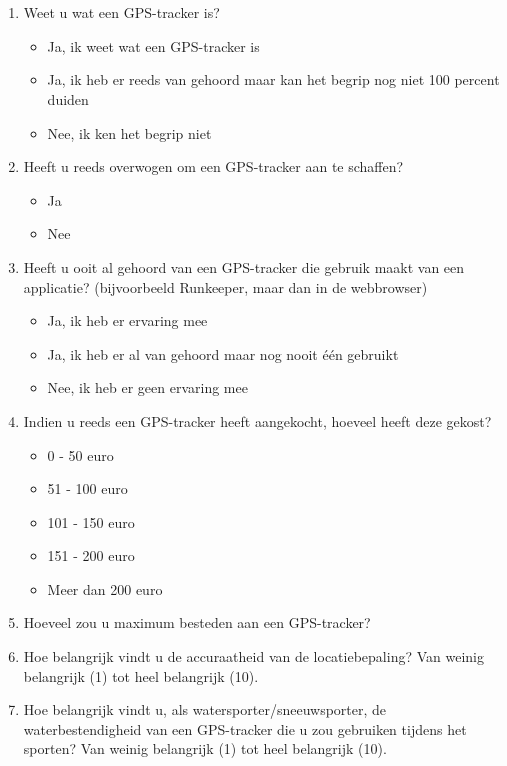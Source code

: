 \chapter{}
\label{ch:enquete}
\begin{enumerate}
	\item Weet u wat een GPS-tracker is?
	\begin{itemize}
		\item Ja, ik weet wat een GPS-tracker is
		\item Ja, ik heb er reeds van gehoord maar kan het begrip nog niet 100 percent duiden
		\item Nee, ik ken het begrip niet
	\end{itemize}
	\item Heeft u reeds overwogen om een GPS-tracker aan te schaffen?
	\begin{itemize}
		\item Ja
		\item Nee
	\end{itemize}
	\item Heeft u ooit al gehoord van een GPS-tracker die gebruik maakt van een applicatie? (bijvoorbeeld Runkeeper, maar dan in de webbrowser)
	\begin{itemize}
		\item Ja, ik heb er ervaring mee
		\item Ja, ik heb er al van gehoord maar nog nooit één gebruikt
		\item Nee, ik heb er geen ervaring mee
	\end{itemize}
	\item Indien u reeds een GPS-tracker heeft aangekocht, hoeveel heeft deze gekost?
	\begin{itemize}
		\item 0 - 50 euro
		\item 51 - 100 euro
		\item 101 - 150 euro
		\item 151 - 200 euro
		\item Meer dan 200 euro
	\end{itemize}
	\item Hoeveel zou u maximum besteden aan een GPS-tracker?
	\item Hoe belangrijk vindt u de accuraatheid van de locatiebepaling? Van weinig belangrijk (1) tot heel belangrijk (10).
	\item Hoe belangrijk vindt u, als watersporter/sneeuwsporter, de waterbestendigheid van een GPS-tracker die u zou gebruiken tijdens het sporten? Van weinig belangrijk (1) tot heel belangrijk (10).

\end{enumerate}
